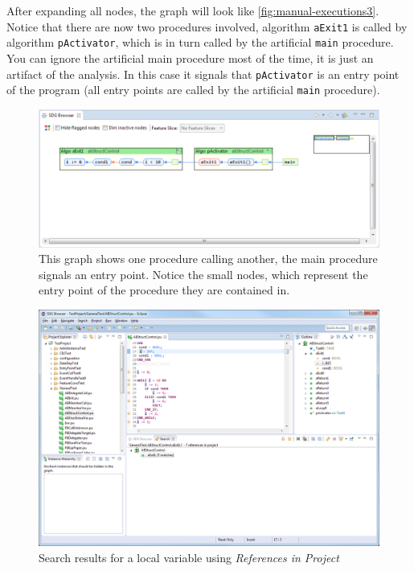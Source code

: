 After expanding all nodes, the graph will look like \autoref{fig:manual-executions3}. Notice that there are now two 
procedures involved, algorithm \lstinline|aExit1| is called by algorithm \lstinline|pActivator|, which is in turn 
called by the artificial \lstinline|main| procedure. You can ignore the artificial main procedure most of the time, 
it is just an artifact of the analysis. In this case it signals that \lstinline|pActivator| is an entry point of the 
program (all entry points are called by the artificial \lstinline|main| procedure).

\begin{figure}[hp]
  \centering
    \includegraphics[width=\textwidth]{bilder/manual-executions3}
  \caption[Graph showing a procedure call and an entry point]
    {This graph shows one procedure calling another, the main procedure signals an entry point. Notice the small nodes, 
    which represent the entry point of the procedure they are contained in.}
  \label{fig:manual-executions3}
\end{figure}

\begin{figure}[!hp]
  \centering
    \includegraphics[width=\textwidth]{bilder/manual-search}
  \caption{Search results for a local variable using \emph{References in Project}}
  \label{fig:manual-search}
\end{figure}


